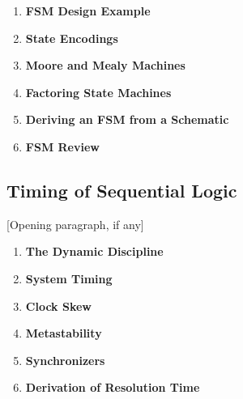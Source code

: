 \documentclass[12pt]{article}
\begin{document}
\begin{enumerate}
    \item \textbf{FSM Design Example}

    \item \textbf{State Encodings}

    \item \textbf{Moore and Mealy Machines}


    \item \textbf{Factoring State Machines}

    \item \textbf{Deriving an FSM from a Schematic}

    \item \textbf{FSM Review}
\end{enumerate}

\subsection{Timing of Sequential Logic}

[Opening paragraph, if any]

\begin{enumerate}
    \item \textbf{The Dynamic Discipline}

    \item \textbf{System Timing}

    \item \textbf{Clock Skew}

    \item \textbf{Metastability}

    \item \textbf{Synchronizers}

    \item \textbf{Derivation of Resolution Time}
\end{enumerate}
\end{document}
